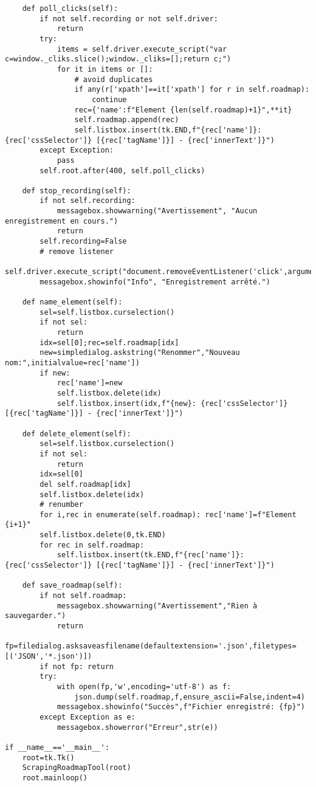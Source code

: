 \documentclass[10pt,a4paper,twocolumn]{article}
\begin{document}
\begin{lstlisting}
    def poll_clicks(self):
        if not self.recording or not self.driver:
            return
        try:
            items = self.driver.execute_script("var c=window._cliks.slice();window._cliks=[];return c;")
            for it in items or []:
                # avoid duplicates
                if any(r['xpath']==it['xpath'] for r in self.roadmap):
                    continue
                rec={'name':f"Element {len(self.roadmap)+1}",**it}
                self.roadmap.append(rec)
                self.listbox.insert(tk.END,f"{rec['name']}: {rec['cssSelector']} [{rec['tagName']}] - {rec['innerText']}")
        except Exception:
            pass
        self.root.after(400, self.poll_clicks)

    def stop_recording(self):
        if not self.recording:
            messagebox.showwarning("Avertissement", "Aucun enregistrement en cours.")
            return
        self.recording=False
        # remove listener
        self.driver.execute_script("document.removeEventListener('click',arguments.callee,true);")
        messagebox.showinfo("Info", "Enregistrement arrêté.")

    def name_element(self):
        sel=self.listbox.curselection()
        if not sel:
            return
        idx=sel[0];rec=self.roadmap[idx]
        new=simpledialog.askstring("Renommer","Nouveau nom:",initialvalue=rec['name'])
        if new:
            rec['name']=new
            self.listbox.delete(idx)
            self.listbox.insert(idx,f"{new}: {rec['cssSelector']} [{rec['tagName']}] - {rec['innerText']}")

    def delete_element(self):
        sel=self.listbox.curselection()
        if not sel:
            return
        idx=sel[0]
        del self.roadmap[idx]
        self.listbox.delete(idx)
        # renumber
        for i,rec in enumerate(self.roadmap): rec['name']=f"Element {i+1}"
        self.listbox.delete(0,tk.END)
        for rec in self.roadmap:
            self.listbox.insert(tk.END,f"{rec['name']}: {rec['cssSelector']} [{rec['tagName']}] - {rec['innerText']}")

    def save_roadmap(self):
        if not self.roadmap:
            messagebox.showwarning("Avertissement","Rien à sauvegarder.")
            return
        fp=filedialog.asksaveasfilename(defaultextension='.json',filetypes=[('JSON','*.json')])
        if not fp: return
        try:
            with open(fp,'w',encoding='utf-8') as f:
                json.dump(self.roadmap,f,ensure_ascii=False,indent=4)
            messagebox.showinfo("Succès",f"Fichier enregistré: {fp}")
        except Exception as e:
            messagebox.showerror("Erreur",str(e))

if __name__=='__main__':
    root=tk.Tk()
    ScrapingRoadmapTool(root)
    root.mainloop()
\end{lstlisting}
\end{document}
